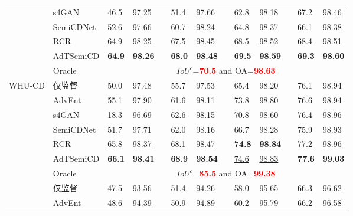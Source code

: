 \documentclass[lang=chs, degree=master, blindreview=false, adobe=false]{yanputhesis}
\begin{document}
\begin{table}[!htbp]
{\begin{tabular}{p{20mm}p{25mm}p{8mm}p{8mm}cp{8mm}p{8mm}cp{8mm}p{8mm}cp{8mm}p{8mm}}
      & s4GAN\cite{mittal2019semi}& 46.5 & 97.25 && 51.4 & 97.66 && 62.8 & 98.18 && 67.2 & 98.46 \\
      & SemiCDNet\cite{peng2021SemiCDNet} & 52.6 & 97.66 && 60.7 & 98.24 && 64.8 & 98.37 && 66.1 & 98.38 \\ %
      & RCR\cite{bandara2022RCR}& \underline{64.9} & \underline{98.25} && \underline{67.5} & \underline{98.45} && \underline{68.5} & \underline{98.52} && \underline{68.4} & \underline{98.51} \\
      \rowcolor{mycyan}
      \multirow{-8}{*}{\cellcolor{white}}& \cellcolor{white}AdTSemiCD   &   \textbf{64.9} & \textbf{98.26} && \textbf{68.0} & \textbf{98.48} && \textbf{69.5} & \textbf{98.59} && \textbf{69.3} & \textbf{98.60} \\%
      \cline{2-13}
      & Oracle & \multicolumn{11}{c}{$ IoU^c$=\textcolor{red}{\bf 70.5} and OA=\textcolor{red}{\bf 98.63}} \\
      \bottomrule
      \multirow{8}{*}{WHU-CD}
      & 仅监督   &   50.0 & 97.48 && 55.7 & 97.53 && 65.4 & 98.20 && 76.1 & 98.94 \\ %
      & AdvEnt\cite{vu2019advent}& 55.1 & 97.90 && 61.6 & 98.11 && 73.8 & 98.80 && 76.6 & 98.94 \\ %
      & s4GAN\cite{mittal2019semi}& 18.3 & 96.69 && 62.6 & 98.15 && 70.8 & 98.60 && 76.4 & 98.96 \\
      & SemiCDNet\cite{peng2021SemiCDNet} & 51.7 & 97.71 && 62.0 & 98.16 && 66.7 & 98.28 && 75.9 & 98.93 \\ %
      & RCR\cite{bandara2022RCR}& \underline{65.8} & \underline{98.37} && \underline{68.1} & \underline{98.47} && \cellcolor{mycyan}\textbf{74.8} & \cellcolor{mycyan}\textbf{98.84} && \underline{77.2} & \underline{98.96} \\
      \rowcolor{mycyan}
      \multirow{-8}{*}{\cellcolor{white}}& \cellcolor{white}AdTSemiCD   &   \textbf{66.1} & \textbf{98.41} && \textbf{68.9} & \textbf{98.54} && \cellcolor{white}\underline{74.6} & \cellcolor{white}\underline{98.83} && \textbf{77.6} & \textbf{99.03} \\%
      \cline{2-13}
      & Oracle & \multicolumn{11}{c}{$ IoU^c$=\textcolor{red}{\bf 85.5} and OA=\textcolor{red}{\bf 99.38}} \\
      \bottomrule
      \multirow{8}{*}{GZ-CD}
      & 仅监督   &   47.5 & 93.56 && 51.4 & 94.26 && 58.0 & 95.65 && 66.3 & \underline{96.62} \\ %
      & AdvEnt\cite{vu2019advent}& 48.6 & \underline{94.39} && 50.9 & 94.89 && 60.2 & 95.79 && 66.2 & 96.58 \\ %

\end{tabular}}
\end{table}
\end{document}

